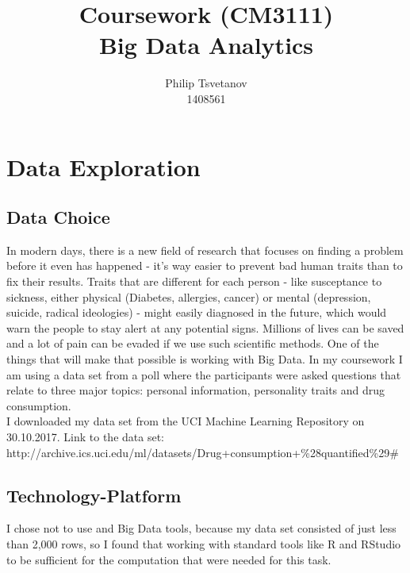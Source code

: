 \documentclass{article}\usepackage[]{graphicx}\usepackage[]{color}
\begin{document}
\title{Coursework (CM3111) \\ Big Data Analytics}
\author{Philip Tsvetanov \\ 1408561}

\maketitle

\section{Data Exploration}

\subsection{Data Choice}
In modern days, there is a new field of research that focuses on finding a problem before it even has happened - it's way easier to prevent bad human traits than to fix their results. Traits that are different for each person - like susceptance to sickness, either physical (Diabetes, allergies, cancer) or mental (depression, suicide, radical ideologies) - might easily diagnosed in the future, which would warn the people to stay alert at any potential signs. Millions of lives can be saved and a lot of pain can be evaded if we use such scientific methods. One of the things that will make that possible is working with Big Data. In my coursework I am using a data set from a poll where the participants were asked questions that relate to three major topics: personal information, personality traits and drug consumption. \\
  
I downloaded my data set from the UCI Machine Learning Repository on 30.10.2017. Link to the data set: http://archive.ics.uci.edu/ml/datasets/Drug+consumption+\%28quantified\%29# \\


\subsection{Technology-Platform}
I chose not to use and Big Data tools, because my data set consisted of just less than 2,000 rows, so I found that working with standard tools like R and RStudio to be sufficient for the computation that were needed for this task.
\end{document}
